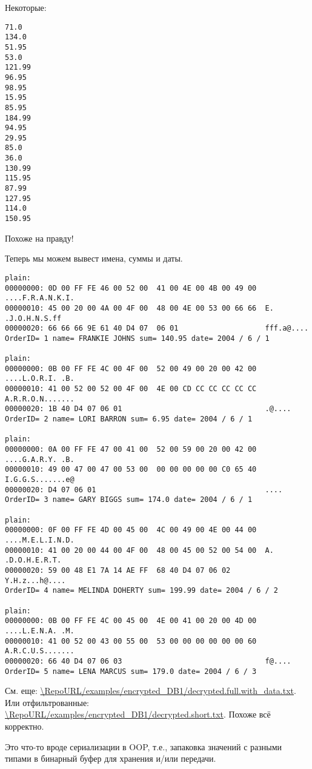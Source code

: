Некоторые:

\begin{lstlisting}
71.0
134.0
51.95
53.0
121.99
96.95
98.95
15.95
85.95
184.99
94.95
29.95
85.0
36.0
130.99
115.95
87.99
127.95
114.0
150.95
\end{lstlisting}

Похоже на правду!

Теперь мы можем вывест имена, суммы и даты.

\begin{lstlisting}
plain:
00000000: 0D 00 FF FE 46 00 52 00  41 00 4E 00 4B 00 49 00  ....F.R.A.N.K.I.
00000010: 45 00 20 00 4A 00 4F 00  48 00 4E 00 53 00 66 66  E. .J.O.H.N.S.ff
00000020: 66 66 66 9E 61 40 D4 07  06 01                    fff.a@....
OrderID= 1 name= FRANKIE JOHNS sum= 140.95 date= 2004 / 6 / 1

plain:
00000000: 0B 00 FF FE 4C 00 4F 00  52 00 49 00 20 00 42 00  ....L.O.R.I. .B.
00000010: 41 00 52 00 52 00 4F 00  4E 00 CD CC CC CC CC CC  A.R.R.O.N.......
00000020: 1B 40 D4 07 06 01                                 .@....
OrderID= 2 name= LORI BARRON sum= 6.95 date= 2004 / 6 / 1

plain:
00000000: 0A 00 FF FE 47 00 41 00  52 00 59 00 20 00 42 00  ....G.A.R.Y. .B.
00000010: 49 00 47 00 47 00 53 00  00 00 00 00 00 C0 65 40  I.G.G.S.......e@
00000020: D4 07 06 01                                       ....
OrderID= 3 name= GARY BIGGS sum= 174.0 date= 2004 / 6 / 1

plain:
00000000: 0F 00 FF FE 4D 00 45 00  4C 00 49 00 4E 00 44 00  ....M.E.L.I.N.D.
00000010: 41 00 20 00 44 00 4F 00  48 00 45 00 52 00 54 00  A. .D.O.H.E.R.T.
00000020: 59 00 48 E1 7A 14 AE FF  68 40 D4 07 06 02        Y.H.z...h@....
OrderID= 4 name= MELINDA DOHERTY sum= 199.99 date= 2004 / 6 / 2

plain:
00000000: 0B 00 FF FE 4C 00 45 00  4E 00 41 00 20 00 4D 00  ....L.E.N.A. .M.
00000010: 41 00 52 00 43 00 55 00  53 00 00 00 00 00 00 60  A.R.C.U.S.......
00000020: 66 40 D4 07 06 03                                 f@....
OrderID= 5 name= LENA MARCUS sum= 179.0 date= 2004 / 6 / 3
\end{lstlisting}

См. еще: \url{\RepoURL/examples/encrypted_DB1/decrypted.full.with_data.txt}.
Или отфильтрованные: \url{\RepoURL/examples/encrypted_DB1/decrypted.short.txt}.
Похоже всё корректно.

Это что-то вроде сериализации в \ac{OOP}, т.е., запаковка значений с разными типами в бинарный буфер для хранения и/или
передачи.

